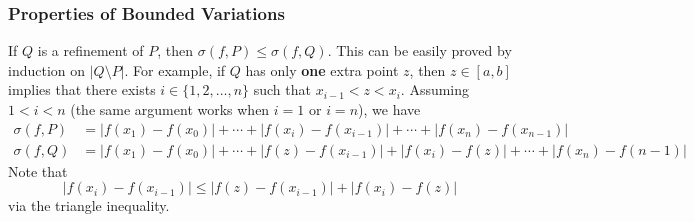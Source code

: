 \subsubsection{Properties of Bounded Variations}

\begin{remark}
    If \( Q  \) is a refinement of \( P \), then \( \sigma(f,P) \leq \sigma(f,Q) \). This can be easily proved by induction on \( | Q \setminus  P  |  \). For example, if \( Q  \) has only \textbf{one} extra point \( z  \), then \( z \in [a,b] \) implies that there exists \( i \in \{ 1,2, \dots, n  \}  \) such that \( {x}_{i-1 } < z < {x}_{i} \). Assuming \( 1 < i < n  \) (the same argument works when \( i = 1  \) or \( i = n  \)), we have   
    \begin{align*}
        \sigma(f,P) &= | f({x}_{1}) - f({x}_{0}) |  + \cdots + | f({x}_{i}) - f({x}_{i-1}) |  + \cdots + | f({x}_{n}) - f({x}_{n-1}) |  \\
        \sigma(f,Q) &= | f({x}_{1}) - f({x}_{0}) |  + \cdots + | f(z ) - f({x}_{i-1}) |  + | f({x}_{i}) - f(z)  |  + \cdots + | f({x}_{n}) - f(n-1) | 
    \end{align*}
    Note that 
    \[  | f({x}_{i})- f({x}_{i-1}) | \leq | f(z) - f({x}_{i-1}) |  + | f({x}_{i}) - f(z) |  \]
    via the triangle inequality.
\end{remark}

